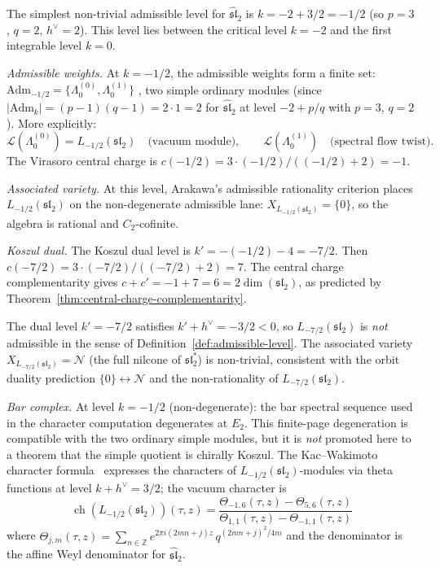 \begin{example}[\texorpdfstring{$\widehat{\mathfrak{sl}}_2$}{sl-hat_2} at admissible level
\texorpdfstring{$k = -1/2$}{k = -1/2}]
\label{ex:sl2-admissible}
The simplest non-trivial admissible level for
$\widehat{\mathfrak{sl}}_2$ is $k = -2 + 3/2 = -1/2$
(so $p = 3$, $q = 2$, $h^\vee = 2$). This level lies between
the critical level $k = -2$ and the first integrable level $k = 0$.

\emph{Admissible weights.}
At $k = -1/2$, the admissible weights form a finite set:
$\mathrm{Adm}_{-1/2} = \{\Lambda_0^{(0)}, \Lambda_0^{(1)}\}$
, two simple ordinary modules
(since $|\mathrm{Adm}_k| = (p - 1)(q - 1) = 2 \cdot 1 = 2$
for $\widehat{\mathfrak{sl}}_2$ at level $-2 + p/q$ with
$p = 3$, $q = 2$). More explicitly:
\[
\mathcal{L}(\Lambda_0^{(0)}) = L_{-1/2}(\mathfrak{sl}_2)
\quad\text{(vacuum module)},
\qquad
\mathcal{L}(\Lambda_0^{(1)})
\quad\text{(spectral flow twist)}.
\]
The Virasoro central charge is
$c(-1/2) = 3 \cdot (-1/2)/((-1/2) + 2) = -1$.

\emph{Associated variety.}
At this level, Arakawa's admissible rationality criterion places
$L_{-1/2}(\mathfrak{sl}_2)$ on the non-degenerate admissible lane:
$X_{L_{-1/2}(\mathfrak{sl}_2)} = \{0\}$, so the algebra is
rational and $C_2$-cofinite.

\emph{Koszul dual.}
The Koszul dual level is $k' = -(-1/2) - 4 = -7/2$. Then
$c(-7/2) = 3 \cdot (-7/2)/((-7/2) + 2) = 7$. The central
charge complementarity gives $c + c' = -1 + 7 = 6 =
2\dim(\mathfrak{sl}_2)$, as predicted by
Theorem~\ref{thm:central-charge-complementarity}.

The dual level $k' = -7/2$ satisfies
$k' + h^\vee = -3/2 < 0$, so $L_{-7/2}(\mathfrak{sl}_2)$
is \emph{not} admissible in the sense of
Definition~\ref{def:admissible-level}. The associated variety
$X_{L_{-7/2}(\mathfrak{sl}_2)} = \mathcal{N}$
(the full nilcone of $\mathfrak{sl}_2^*$) is non-trivial,
consistent with the orbit duality prediction
$\{0\} \leftrightarrow \mathcal{N}$ and the non-rationality
of $L_{-7/2}(\mathfrak{sl}_2)$.

\emph{Bar complex.}
At level $k = -1/2$ (non-degenerate): the bar spectral sequence
used in the character computation degenerates at $E_2$. This
finite-page degeneration is compatible with the two ordinary
simple modules, but it is \emph{not} promoted here to a theorem
that the simple quotient is chirally Koszul. The
Kac--Wakimoto character formula~\cite{KW88}
expresses the characters of $L_{-1/2}(\mathfrak{sl}_2)$-modules
via theta functions at level $k + h^\vee = 3/2$; the vacuum
character is
\[
\operatorname{ch}(L_{-1/2}(\mathfrak{sl}_2))(\tau, z)
= \frac{\Theta_{-1,6}(\tau, z) - \Theta_{5,6}(\tau, z)}
 {\Theta_{1,1}(\tau, z) - \Theta_{-1,1}(\tau, z)}
\]
where $\Theta_{j,m}(\tau, z) = \sum_{n \in \mathbb{Z}}
e^{2\pi i(2mn+j)z}\, q^{(2mn+j)^2/4m}$ and the denominator is
the affine Weyl denominator for $\widehat{\mathfrak{sl}}_2$.
\end{example}


